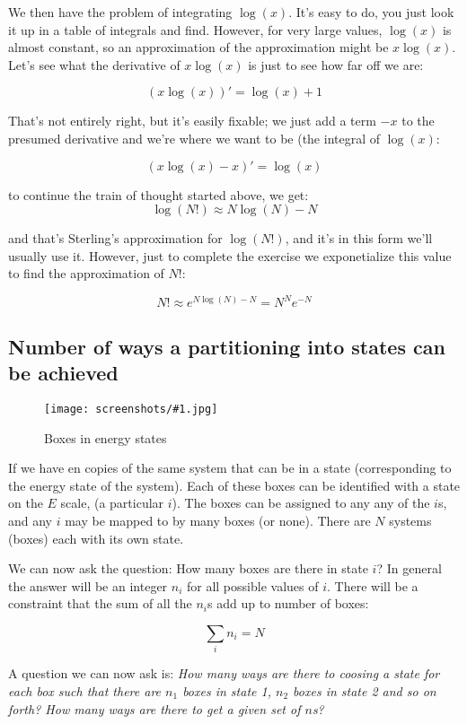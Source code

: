 \documentclass[a4, 12pt, english, USenglish]{scrreprt}
\newcommand{\screenshot}[2]{
\begin{figure}[htb]
\texttt{[image: screenshots/\#1.jpg]}
\label{#1}
\caption{#2}
\end{figure}}
\begin{document}
We then have the problem of integrating \(\log(x)\).  It's easy to do,
you just look it up in a table of integrals and find.  However, for
very large values, \(\log(x)\) is almost constant, so an approximation
of the approximation might be \(x\log(x)\).  Let's see what the
derivative of  \(x\log(x)\) is just to see how far off we are:

\[
   (x\log(x))' = \log(x) + 1
\]

That's not entirely right, but it's easily fixable; we just add a term
\(-x\) to the presumed derivative and we're where we want to be (the
integral of \(\log(x)\):

\[
   (x\log(x) -x )' = \log(x)
\]

to continue the train of thought started above, we get:
\[
  \log(N!) \approx N\log(N) - N
\]

and that's Sterling's approximation for \(\log(N!)\), and it's in this
form we'll usually use it.  However, just to complete the exercise we
exponetialize this value to find the approximation of \(N!\):

\[
   N! \approx e^{N\log(N) - N} = N^N  e^{-N}
\]

\subsection{Number of ways a partitioning into states can be achieved}

\screenshot{energystates}{Boxes in energy states}

If we have en copies of the same system that can be in a state
(corresponding to the energy state of the system).  Each of these
boxes can be identified with a state on the \(E\) scale, (a particular
\(i\)).  The boxes can be assigned to any  any of the \(i\)s, and any
\(i\) may be mapped to by many boxes (or none).   There are \(N\)
systems (boxes) each with its own state.

We can now ask the question: How many boxes are there in state \(i\)?
In general the answer will be an integer \(n_i\) for all possible
values of \(i\).  There will be a constraint that the sum of all the
\(n_i\)s add up to number of boxes:

\[
    \sum_i n_i = N
\]

A question we can now ask is: {\em How many ways are there to coosing
  a state for each box such that there are \(n_1\) boxes in state 1,
  \(n_2\) boxes in state 2 and so on forth?  How many ways are there
  to get a given set of \(n\)s?}
\end{document}
